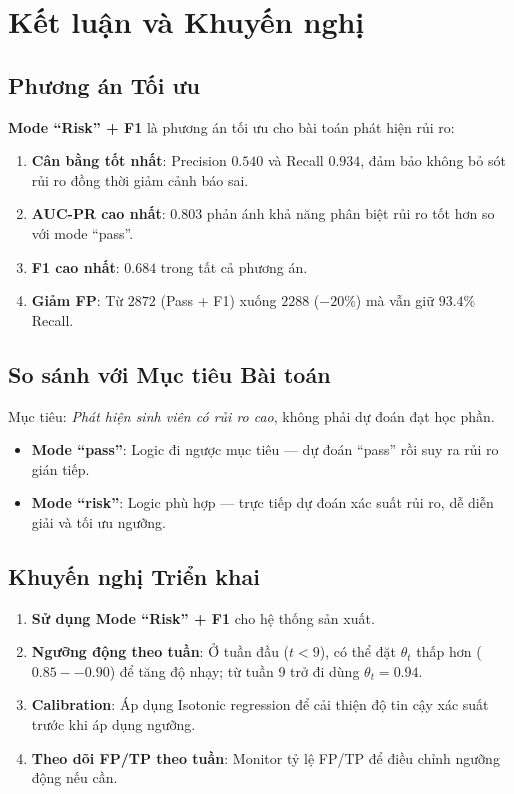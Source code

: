\documentclass[12pt,a4paper]{article}
\begin{document}
\section{Kết luận và Khuyến nghị}

\subsection{Phương án Tối ưu}

\textbf{Mode ``Risk'' + F1} là phương án tối ưu cho bài toán phát hiện rủi ro:

\begin{enumerate}
    \item \textbf{Cân bằng tốt nhất}: Precision $0.540$ và Recall $0.934$, đảm bảo không bỏ sót rủi ro đồng thời giảm cảnh báo sai.
    \item \textbf{AUC-PR cao nhất}: $0.803$ phản ánh khả năng phân biệt rủi ro tốt hơn so với mode ``pass''.
    \item \textbf{F1 cao nhất}: $0.684$ trong tất cả phương án.
    \item \textbf{Giảm FP}: Từ $2872$ (Pass + F1) xuống $2288$ ($-20\%$) mà vẫn giữ $93.4\%$ Recall.
\end{enumerate}

\subsection{So sánh với Mục tiêu Bài toán}

Mục tiêu: \emph{Phát hiện sinh viên có rủi ro cao}, không phải dự đoán đạt học phần.

\begin{itemize}
    \item \textbf{Mode ``pass''}: Logic đi ngược mục tiêu --- dự đoán ``pass'' rồi suy ra rủi ro gián tiếp.
    \item \textbf{Mode ``risk''}: Logic phù hợp --- trực tiếp dự đoán xác suất rủi ro, dễ diễn giải và tối ưu ngưỡng.
\end{itemize}

\subsection{Khuyến nghị Triển khai}

\begin{enumerate}
    \item \textbf{Sử dụng Mode ``Risk'' + F1} cho hệ thống sản xuất.
    \item \textbf{Ngưỡng động theo tuần}: Ở tuần đầu ($t < 9$), có thể đặt $\theta_t$ thấp hơn ($0.85--0.90$) để tăng độ nhạy; từ tuần 9 trở đi dùng $\theta_t = 0.94$.
    \item \textbf{Calibration}: Áp dụng Isotonic regression để cải thiện độ tin cậy xác suất trước khi áp dụng ngưỡng.
    \item \textbf{Theo dõi FP/TP theo tuần}: Monitor tỷ lệ FP/TP để điều chỉnh ngưỡng động nếu cần.
\end{enumerate}
\end{document}
